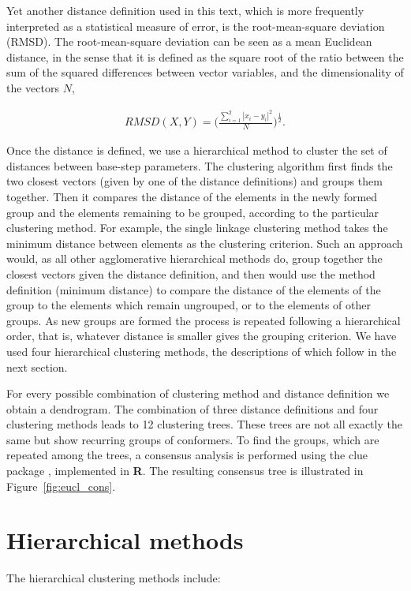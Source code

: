 Yet  another distance  definition used  in  this text,  which is  more
frequently  interpreted as  a  statistical measure  of  error, is  the
root-mean-square deviation (RMSD).  The root-mean-square deviation can
be seen as a mean Euclidean  distance, in the sense that it is defined
as  the square  root  of the  ratio  between the  sum  of the  squared
differences between  vector variables,  and the dimensionality  of the
vectors $N$,

\begin{gather}
RMSD(X,Y)      =     \Big(      \frac{\sum_{i=1}^2     |x_i-y_i|^2}{N}
\Big)^\frac{1}{2} .\label{eq:rmsd}
\end{gather}

Once the distance is defined,  we use a hierarchical method to cluster
the  set of  distances between  base-step parameters.   The clustering
algorithm first  finds the  two closest vectors  (given by one  of the
distance definitions) and groups  them together.  Then it compares the
distance of  the elements in the  newly formed group  and the elements
remaining  to  be  grouped,  according to  the  particular  clustering
method.  For  example, the single linkage clustering  method takes the
minimum distance  between elements as the  clustering criterion.  Such
an approach would, as all other agglomerative hierarchical methods do,
group together the closest  vectors given the distance definition, and
then would use the method definition (minimum distance) to compare the
distance of  the elements  of the group  to the elements  which remain
ungrouped,  or to  the elements  of other  groups. As  new  groups are
formed the  process is repeated  following a hierarchical  order, that
is,  whatever distance is  smaller gives  the grouping  criterion.  We
have used  four hierarchical  clustering methods, the  descriptions of
which follow in the next section.

For  every  possible combination  of  clustering  method and  distance
definition we  obtain a dendrogram. The combination  of three distance
definitions and four clustering  methods leads to 12 clustering trees.
These trees are not all exactly  the same but show recurring groups of
conformers.  To find the groups, which are repeated among the trees, a
consensus  analysis  is  performed  using  the  \textsf{clue}  package
\cite{hornik2005}, implemented in  \textbf{R}. The resulting consensus
tree is illustrated in Figure~\ref{fig:eucl_cons}.

\section{Hierarchical methods}
The hierarchical clustering methods include:

